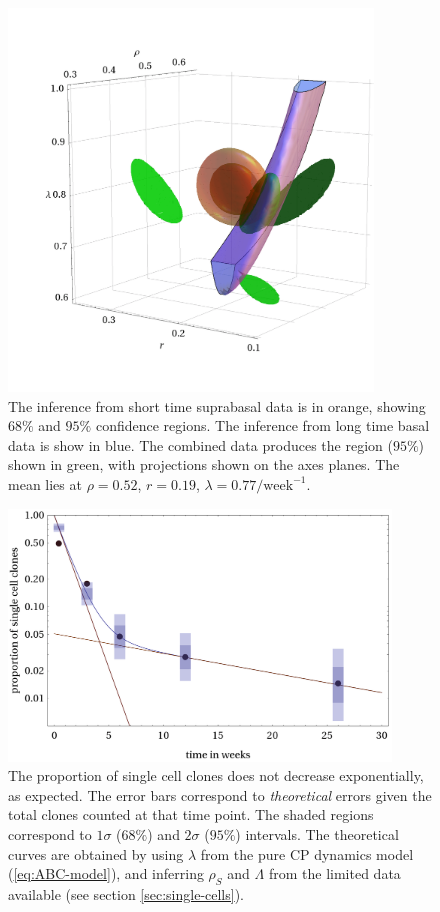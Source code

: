 \documentclass[10pt,UKenglish]{article}
\begin{document}
\begin{figure}[htb]
	\centering
	\includegraphics[height=4in]{oes-combined-prior.png}
	\caption{\label{fig:inferences}The inference from short time suprabasal data is in orange, showing $68\%$ and $95\%$ confidence regions. The inference from long time basal data is show in blue. The combined data produces the region ($95\%$) shown in green, with projections shown on the axes planes. The mean lies at $\rho = 0.52$, $r = 0.19$, $\lambda = 0.77/\textrm{week}^{-1}$.}
\end{figure}

\begin{figure}[htb]
	\centering
	\includegraphics[width=4in]{single-cell-clones.png}
	\caption{\label{fig:single-cell}The proportion of single cell clones does not decrease exponentially, as expected. The error bars correspond to \emph{theoretical} errors given the total clones counted at that time point. The shaded regions correspond to $1\sigma$ ($68\%$) and $2\sigma$ ($95\%$) intervals. The theoretical curves are obtained by using $\lambda$ from the pure CP dynamics model (\ref{eq:ABC-model}), and inferring $\rho_S$ and $\Lambda$ from the limited data available (see section \ref{sec:single-cells}).}
\end{figure}
\end{document}
